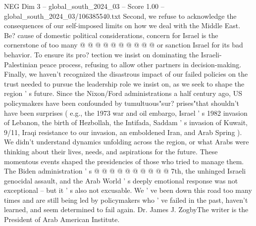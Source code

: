 \begin{textsample}{NEG Dim 3 – global\_south\_2024\_03 – Score 1.00 – global\_south\_2024\_03/106385540.txt}
Second, we refuse to acknowledge the consequences of our self-imposed limits on how we deal with the Middle East.
Be? cause of domestic political considerations, concern for Israel is the cornerstone of too many @ @ @ @ @ @ @ @ @ @ or sanction Israel for its bad behavior.
To ensure its pro? tection we insist on dominating the Israeli-Palestinian peace process, refusing to allow other partners in decision-making.
Finally, we haven't recognized the disastrous impact of our failed policies on the trust needed to pursue the leadership role we insist on, as we seek to shape the region ' s future.
Since the Nixon/Ford administrations a half century ago, US policymakers have been confounded by tumultuous"sur? prises"that shouldn't have been surprises ( e.g., the 1973 war and oil embargo, Israel ' s 1982 invasion of Lebanon, the birth of Hezbollah, the Intifada, Saddam ' s invasion of Kuwait, 9/11, Iraqi resistance to our invasion, an emboldened Iran, and Arab Spring ).
We didn't understand dynamics unfolding across the region, or what Arabs were thinking about their lives, needs, and aspirations for the future.
These momentous events shaped the presidencies of those who tried to manage them.
The Biden administration ' s @ @ @ @ @ @ @ @ @ @ 7th, the unhinged Israeli genocidal assault, and the Arab World ' s deeply emotional response was not exceptional -- but it ' s also not excusable.
We ' ve been down this road too many times and are still being led by policymakers who ' ve failed in the past, haven't learned, and seem determined to fail again.
Dr.
James J.
ZogbyThe writer is the President of Arab American Institute.

\end{textsample}
